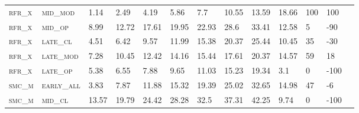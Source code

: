 \begin{sidewaystable}[!htbp]
\begin{tabular}{@{}lllllllllllll@{}}
\footnotesize \textsc{rfr\_x}      & \footnotesize \textsc{mid\_mod  }               & \footnotesize 1.14            & \footnotesize 2.49            & \footnotesize 4.19             & \footnotesize 5.86             & \footnotesize 7.7              & \footnotesize 10.55            & \footnotesize 13.59       & \footnotesize 18.66    & \footnotesize 100    & \footnotesize 100      \\
\footnotesize \textsc{rfr\_x}      & \footnotesize \textsc{mid\_op   }               & \footnotesize 8.99            & \footnotesize 12.72           & \footnotesize 17.61            & \footnotesize 19.95            & \footnotesize 22.93            & \footnotesize 28.6             & \footnotesize 33.41       & \footnotesize 12.58    & \footnotesize 5      & \footnotesize -90      \\
\footnotesize \textsc{rfr\_x}      & \footnotesize \textsc{late\_cl  }               & \footnotesize 4.51            & \footnotesize 6.42            & \footnotesize 9.57             & \footnotesize 11.99            & \footnotesize 15.38            & \footnotesize 20.37            & \footnotesize 25.44       & \footnotesize 10.45    & \footnotesize 35     & \footnotesize -30      \\
\footnotesize \textsc{rfr\_x}      & \footnotesize \textsc{late\_mod }               & \footnotesize 7.28            & \footnotesize 10.45           & \footnotesize 12.42            & \footnotesize 14.16            & \footnotesize 15.44            & \footnotesize 17.61            & \footnotesize 20.37       & \footnotesize 14.57    & \footnotesize 59     & \footnotesize 18       \\
\footnotesize \textsc{rfr\_x}      & \footnotesize \textsc{late\_op  }               & \footnotesize 5.38            & \footnotesize 6.55            & \footnotesize 7.88             & \footnotesize 9.65             & \footnotesize 11.03            & \footnotesize 15.23            & \footnotesize 19.34       & \footnotesize 3.1      & \footnotesize 0      & \footnotesize -100     \\
\footnotesize \textsc{smc\_m}      & \footnotesize \textsc{early\_all}               & \footnotesize 3.83            & \footnotesize 7.87            & \footnotesize 11.88            & \footnotesize 15.32            & \footnotesize 19.39            & \footnotesize 25.02            & \footnotesize 32.65       & \footnotesize 14.98    & \footnotesize 47     & \footnotesize -6       \\
\footnotesize \textsc{smc\_m}      & \footnotesize \textsc{mid\_cl   }               & \footnotesize 13.57           & \footnotesize 19.79           & \footnotesize 24.42            & \footnotesize 28.28            & \footnotesize 32.5             & \footnotesize 37.31            & \footnotesize 42.25       & \footnotesize 9.74     & \footnotesize 0      & \footnotesize -100     \\

\end{tabular}
\end{sidewaystable}
